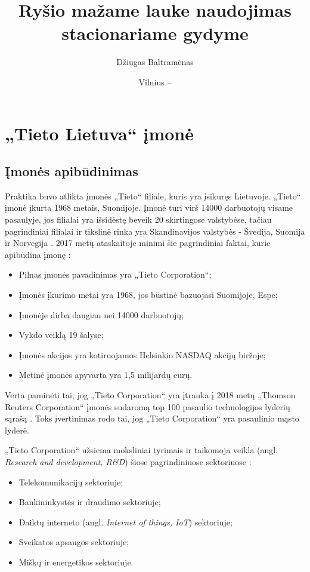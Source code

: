 \documentclass{VUMIFPSbakalaurinis}
\title{Ryšio mažame lauke naudojimas stacionariame gydyme}
\author{Džiugas Baltramėnas}
\date{Vilnius – \the\year}
\begin{document}
\maketitle

\tableofcontents


\section{„Tieto Lietuva“ įmonė}
\subsection{Įmonės apibūdinimas}
Praktika buvo atlikta įmonės „Tieto“ filiale, kuris yra įsikuręs Lietuvoje. „Tieto“ įmonė įkurta 1968 metais, Suomijoje. Įmonė turi virš 14000 darbuotojų visame pasaulyje, jos filialai yra išsidėstę beveik 20 skirtingose valstybėse, tačiau pagrindiniai filialai ir tikslinė rinka yra Skandinavijos valstybės - Švedija, Suomija ir Norvegija \cite{TIETO}. 2017 metų ataskaitoje minimi šie pagrindiniai faktai, kurie apibūdina įmonę \cite{TIETO}:
\begin{itemize}
    \item Pilnas įmonės pavadinimas yra „Tieto Corporation“;
    \item Įmonės įkurimo metai yra 1968, jos būstinė bazuojasi Suomijoje, Espe;
    \item Įmonėje dirba daugiau nei 14000 darbuotojų;
    \item Vykdo veiklą 19 šalyse;
    \item Įmonės akcijos yra kotiruojamos Helsinkio NASDAQ akcijų biržoje;
    \item Metinė įmonės apyvarta yra 1,5 milijardų eurų.
\end{itemize}

Verta paminėti tai, jog  „Tieto Corporation“ yra įtrauka į 2018 metų „Thomson Reuters Corporation“ įmonės sudaromą top 100 pasaulio technologijos lyderių sąrašą \cite{List}. Toks įvertinimas rodo tai, jog „Tieto Corporation“ yra pasaulinio mąsto lyderė.

„Tieto Corporation“ užsiema moksliniai tyrimais ir taikomoja veikla (angl. \textit{Research and development, R&D}) šiose pagrindiniuose sektoriuose \cite{TIETO}:
\begin{itemize}
    \item Telekomunikacijų sektoriuje;
    \item Bankininkystės ir draudimo sektoriuje;
    \item Daiktų interneto (angl. \textit{Internet of things, IoT}) sektoriuje;
    \item Sveikatos apsaugos sektoriuje;
    \item Miškų ir energetikos sektoriuje.
\end{itemize}
\end{document}
